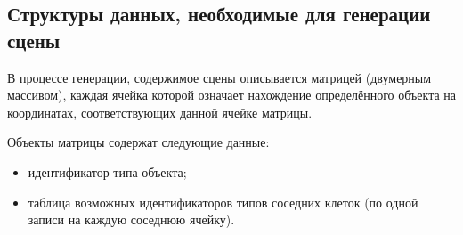 \subsection*{Структуры данных, необходимые для генерации сцены}

В процессе генерации, содержимое сцены описывается матрицей (двумерным массивом), каждая ячейка которой означает нахождение определённого объекта на координатах, соответствующих данной ячейке матрицы.

Объекты матрицы содержат следующие данные:
\begin{itemize}
    \item идентификатор типа объекта;
    \item таблица возможных идентификаторов типов соседних клеток (по одной записи на каждую соседнюю ячейку).
\end{itemize}
